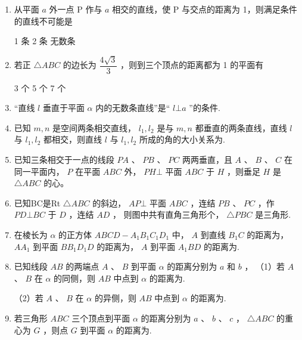 \begin{enumerate}
 {3 个} {2 个} {1 个}

\item 从平面 $a$ 外一点 P 作与 $a$ 相交的直线，使 P 与交点的距离为 1，则满足条件的直线不可能是

 {1 条} {2 条} {无数条}

\item 若正 $\bigtriangleup {ABC}$ 的边长为 $\dfrac{4\sqrt{3}}{3}$ ，则到三个顶点的距离都为 1 的平面有 

 {3 个} {5 个} {7 个}

\item “直线 $l$ 垂直于平面 $\alpha$ 内的无数条直线”是“ $l\bot a$ ”的条件.

\item 已知 $m,n$ 是空间两条相交直线， ${l}_{1},{l}_{2}$ 是与 $m,n$ 都垂直的两条直线，直线 $l$ 与 ${l}_{1},{l}_{2}$ 都相交，则直线 $l$ 与 ${l}_{1},{l}_{2}$ 所成的角的大小关系为.

\item 已知三条相交于一点的线段 ${PA}\text{ 、 }{PB}\text{ 、 }{PC}$ 两两垂直，且 $A\text{ 、 }B\text{ 、 }C$ 在同一平面内， $P$ 在平面 ${ABC}$ 外， ${PH}\bot$ 平面 ${ABC}$ 于 $H$ ，则垂足 $H$ 是 $\bigtriangleup  {ABC}$ 的心。


\item 已知BC是Rt $\bigtriangleup  {ABC}$ 的斜边， ${AP}\bot$ 平面 ${ABC}$ ，连结 ${PB}\text{ 、 }{PC}$ ，作 ${PD}\bot {BC}$ 于 $D$ ，连结 ${AD}$ ， 则图中共有直角三角形个， $\bigtriangleup  {PBC}$ 是三角形.

\item 在棱长为 $\alpha$ 的正方体 ${ABCD} - {A}_{1}{B}_{1}{C}_{1}{D}_{1}$ 中， $A$ 到直线 ${B}_{1}C$ 的距离为， $A{A}_{1}$ 到平面 $B{B}_{1}{D}_{1}D$ 的距离为， $A$ 到平面 ${A}_{1}{BD}$ 的距离为.


\item 已知线段 ${AB}$ 的两端点 $A$ 、 $B$ 到平面 $\alpha$ 的距离分别为 $a$ 和 $b$ ， （1）若 $A$ 、 $B$ 在 $\alpha$ 的同侧，则 ${AB}$ 中点到 $\alpha$ 的距离为.

（2）若 $A$ 、 $B$ 在 $\alpha$ 的异侧，则 ${AB}$ 中点到 $\alpha$ 的距离为.

\item 若三角形 ${ABC}$ 三个顶点到平面 $\alpha$ 的距离分别为 $a$ 、 $b$ 、 $c$ ， $\bigtriangleup {ABC}$ 的重心为 $G$ ，则点 $G$ 到平面 $\alpha$ 的距离为.


\end{enumerate}
